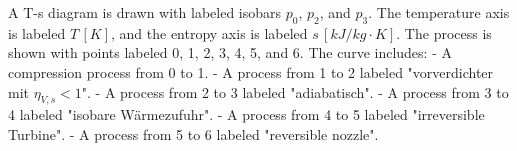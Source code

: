 A T-s diagram is drawn with labeled isobars \( p_0 \), \( p_2 \), and \( p_3 \). The temperature axis is labeled \( T \, [K] \), and the entropy axis is labeled \( s \, [kJ/kg·K] \). The process is shown with points labeled 0, 1, 2, 3, 4, 5, and 6. The curve includes:  
- A compression process from 0 to 1.  
- A process from 1 to 2 labeled "vorverdichter mit \( \eta_{V,s} < 1 \)".  
- A process from 2 to 3 labeled "adiabatisch".  
- A process from 3 to 4 labeled "isobare Wärmezufuhr".  
- A process from 4 to 5 labeled "irreversible Turbine".  
- A process from 5 to 6 labeled "reversible nozzle".